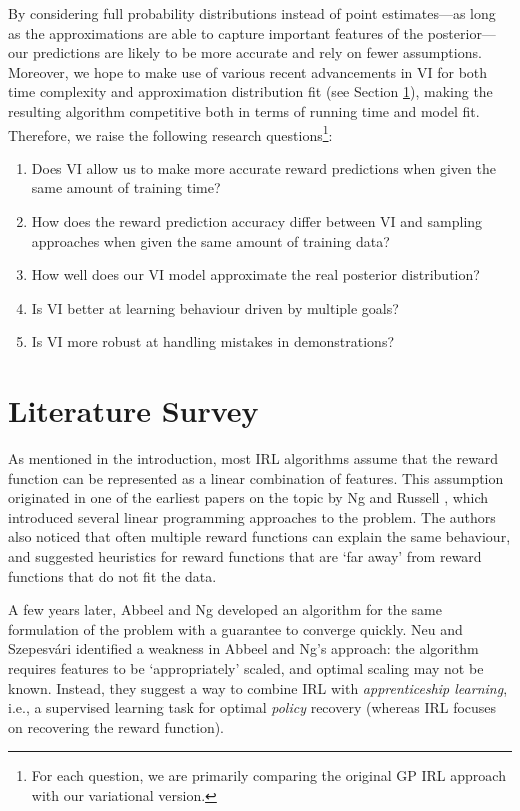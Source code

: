 \documentclass{mprop}
\theoremstyle{definition}
\begin{document}
By considering full probability distributions instead of point estimates---as
long as the approximations are able to capture important features of the
posterior---our predictions are likely to be more accurate and rely on fewer
assumptions. Moreover, we hope to make use of various recent advancements in VI
for both time complexity and approximation distribution fit (see Section
\ref{literature}), making the resulting algorithm competitive both in terms of
running time and model fit. Therefore, we raise the following research
questions\footnote{For each question, we are primarily comparing the original GP
IRL approach \cite{DBLP:conf/nips/LevinePK11} with our variational version.}:
\begin{enumerate}
\item Does VI allow us to make more accurate reward predictions when given the
  same amount of training time?
\item How does the reward prediction accuracy differ between VI and sampling
  approaches when given the same amount of training data?
\item How well does our VI model approximate the real posterior distribution?
\item Is VI better at learning behaviour driven by multiple goals?
\item Is VI more robust at handling mistakes in demonstrations?
\end{enumerate}

\section{Literature Survey} \label{literature}

As mentioned in the introduction, most IRL algorithms assume that the reward
function can be represented as a linear combination of features. This assumption
originated in one of the earliest papers on the topic by Ng and Russell
\cite{DBLP:conf/icml/NgR00}, which introduced several linear programming
approaches to the problem. The authors also noticed that often
multiple reward functions can explain the same behaviour, and suggested
heuristics for reward functions that are `far away' from reward functions that
do not fit the data.

A few years later, Abbeel and Ng \cite{DBLP:conf/icml/PieterN04} developed an
algorithm for the same formulation of the problem with a guarantee to converge
quickly. Neu and Szepesv\'ari \cite{DBLP:conf/uai/NeuS07} identified a weakness
in Abbeel and Ng's approach: the algorithm requires features to be
`appropriately' scaled, and optimal scaling may not be known. Instead, they
suggest a way to combine IRL with \emph{apprenticeship learning}, i.e., a
supervised learning task for optimal \emph{policy} recovery (whereas IRL focuses
on recovering the reward function).
\end{document}
